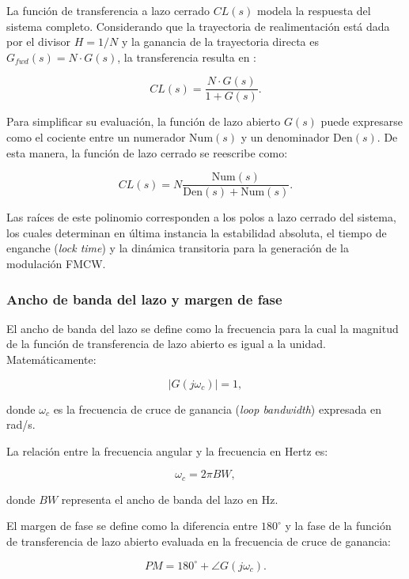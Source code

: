 La función de transferencia a lazo cerrado $CL(s)$ modela la respuesta del sistema completo. Considerando que la trayectoria de realimentación está dada por el divisor $H = 1/N$ y la ganancia de la trayectoria directa es $G_{fwd}(s) = N \cdot G(s)$, la transferencia resulta en \cite{Dean Banerjee}:

\begin{equation}
CL(s) = \frac{N \cdot G(s)}{1 + G(s)}.
\end{equation}

Para simplificar su evaluación, la función de lazo abierto $G(s)$ puede expresarse como el cociente entre un numerador $\text{Num}(s)$ y un denominador $\text{Den}(s)$. De esta manera, la función de lazo cerrado se reescribe como:

\begin{equation}
CL(s) = N \frac{\text{Num}(s)}{\text{Den}(s) + \text{Num}(s)}.
\end{equation}

Las raíces de este polinomio corresponden a los polos a lazo cerrado del sistema, los cuales determinan en última instancia la estabilidad absoluta, el tiempo de enganche (\textit{lock time}) y la dinámica transitoria para la generación de la modulación FMCW.

\subsubsection{Ancho de banda del lazo y margen de fase}

El ancho de banda del lazo se define como la frecuencia para la cual la magnitud de la función de transferencia de lazo abierto es igual a la unidad. Matemáticamente:

\begin{equation}
\left|G(j\omega_c)\right| = 1,
\label{eq:bw1}
\end{equation}

donde $\omega_c$ es la frecuencia de cruce de ganancia (\textit{loop bandwidth}) expresada en rad/s.

La relación entre la frecuencia angular y la frecuencia en Hertz es:

\begin{equation}
\omega_c = 2\pi BW,
\label{eq:bw2}
\end{equation}

donde $BW$ representa el ancho de banda del lazo en Hz.

El margen de fase se define como la diferencia entre $180^\circ$ y la fase de la función de transferencia de lazo abierto evaluada en la frecuencia de cruce de ganancia:

\begin{equation}
PM = 180^\circ + \angle G(j\omega_c).
\label{eq:pm}
\end{equation}